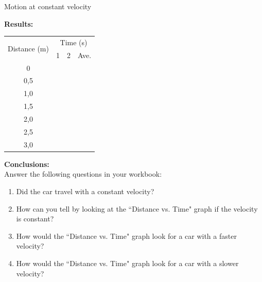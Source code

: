 \begin{g_experiment}{Motion at constant velocity }
\begin{enumerate}[noitemsep, label=\textbf{\arabic*}. ]
\end{enumerate}
        \par 
        \label{m38795*id71410}\noindent{}\textbf{Results:}
\begin{center}
\begin{tabular}{|c|p{0.5cm}|p{0.5cm}|p{0.5cm}|}\hline
\multirow{2}{*}{Distance (m)}&\multicolumn{3}{c|}{Time (s)}\\\cline{2-4}
&1&2&Ave.\\\hline
0&&&\\\hline
0,5&&&\\\hline
1,0&&&\\\hline
1,5&&&\\\hline
2,0&&&\\\hline
2,5&&&\\\hline
3,0&&&\\\hline
\end{tabular}
\end{center}
    \par
        \label{m38795*id71722}\noindent{}\textbf{Conclusions:}\\
Answer the following questions in your workbook:
        \label{m38795*id71746}\begin{enumerate}[noitemsep, label=\textbf{\arabic*}. ] 
            \label{m38795*uid108}\item Did the car travel with a constant velocity?
\label{m38795*uid109}\item How can you tell by looking at the ``Distance vs. Time" graph if the velocity is constant?
\label{m38795*uid110}\item How would the ``Distance vs. Time" graph look for a car with a faster velocity?
\label{m38795*uid111}\item How would the ``Distance vs. Time" graph look for a car with a slower velocity?
\end{enumerate}
\end{g_experiment}
        \par 
      \label{m38795*uid112}
